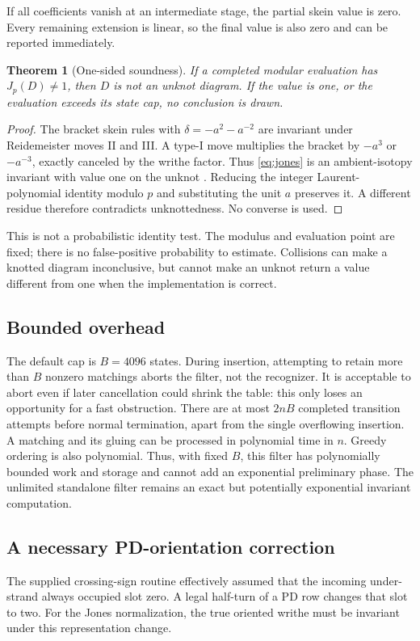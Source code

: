 \documentclass[11pt]{article}
\newtheorem{theorem}{Theorem}[section]
\theoremstyle{remark}\newtheorem{remark}[theorem]{Remark}
\begin{document}
If all coefficients vanish at an intermediate stage, the partial skein
value is zero. Every remaining extension is linear, so the final value is
also zero and can be reported immediately.

\begin{theorem}[One-sided soundness]
If a completed modular evaluation has $J_p(D)\ne1$, then $D$ is not an
unknot diagram. If the value is one, or the evaluation exceeds its state
cap, no conclusion is drawn.
\end{theorem}
\begin{proof}
The bracket skein rules with $\delta=-a^2-a^{-2}$ are invariant under
Reidemeister moves II and III. A type-I move multiplies the bracket by
$-a^{3}$ or $-a^{-3}$, exactly canceled by the writhe factor. Thus
\eqref{eq:jones} is an ambient-isotopy invariant with value one on the
unknot \cite{Kauffman}. Reducing the integer Laurent-polynomial identity
modulo $p$ and substituting the unit $a$ preserves it. A different residue
therefore contradicts unknottedness. No converse is used.
\end{proof}

This is not a probabilistic identity test. The modulus and evaluation point
are fixed; there is no false-positive probability to estimate. Collisions
can make a knotted diagram inconclusive, but cannot make an unknot return
a value different from one when the implementation is correct.

\subsection{Bounded overhead}
The default cap is $B=4096$ states. During insertion, attempting to retain
more than $B$ nonzero matchings aborts the filter, not the recognizer. It is
acceptable to abort even if later cancellation could shrink the table:
this only loses an opportunity for a fast obstruction.
There are at most $2nB$ completed transition attempts before normal
termination, apart from the single overflowing insertion. A matching and
its gluing can be processed in polynomial time in $n$. Greedy ordering is
also polynomial. Thus, with fixed $B$, this filter has polynomially bounded
work and storage and cannot add an exponential preliminary phase.
The unlimited standalone filter remains an exact but potentially
exponential invariant computation.

\subsection{A necessary PD-orientation correction}
The supplied crossing-sign routine effectively assumed that the incoming
under-strand always occupied slot zero. A legal half-turn of a PD row
changes that slot to two. For the Jones normalization, the true oriented
writhe must be invariant under this representation change.
\end{document}
